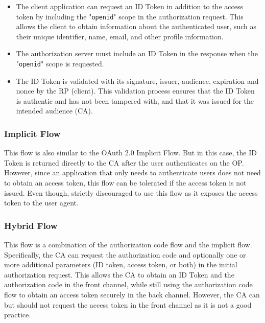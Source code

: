 \documentclass[../memoire.tex]{subfiles}
\begin{document}
\begin{itemize}
  \item The client application can request an ID Token in addition to the access token by including the "\texttt{openid}" scope in the authorization request. This allows the client to obtain information about the authenticated user, such as their unique identifier, name, email, and other profile information.
  \item The authorization server must include an ID Token in the response when the "\texttt{openid}" scope is requested. 
  \item The ID Token is validated with its signature, issuer, audience, expiration and nonce by the RP (client)\cite[p.~152]{wilson2022}. This validation process ensures that the ID Token is authentic and has not been tampered with, and that it was issued for the intended audience (CA).
\end{itemize}


\subsubsection*{Implicit Flow}

This flow is also similar to the OAuth 2.0 Implicit Flow. But in this case, the ID Token is returned directly to the CA after the user authenticates on the OP. However, since an application that only needs to authenticate users does not need to obtain an access token, this flow can be tolerated if the access token is not issued\cite[p.~116]{wilson2022}. Even though, \cite{rfc9700}\cite{oidc_core} strictly discouraged to use this flow as it exposes the access token to the user agent. 

\subsubsection*{Hybrid Flow}

This flow is a combination of the authorization code flow and the implicit flow. Specifically, the CA can request the authorization code and optionally one or more additional parameters (ID token, access token, or both) in the initial authorization request\cite{oidc_core}\cite[p119]{wilson2022}. This allows the CA to obtain an ID Token and the authorization code in the front channel, while still using the authorization code flow to obtain an access token securely in the back channel. However, the CA can but should not request the access token in the front channel as it is not a good practice\cite{oidc_core}\cite{rfc9700}.
\end{document}
